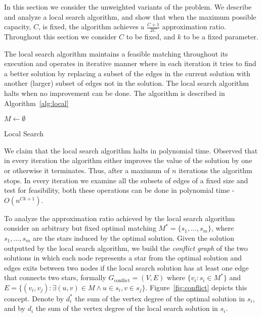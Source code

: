 In this section we consider the unweighted variants of the problem.
We describe and analyze a local search algorithm, 
and show that when the maximum possible capacity, $C$, is fixed, the algorithm achieves 
a $\frac{C + 1}{2C}$ approximation ratio.
Throughout this section we consider $C$ to be fixed, and $k$ to be a fixed parameter.  

The local search algorithm maintains a feasible matching throughout its execution
and operates in 
iterative manner where in each iteration it tries to find a better solution by
replacing a subset of the edges in the current solution with 
another (larger) subset of edges not in the solution.
The local search algorithm halts when no improvement can be done.
The algorithm is described in Algorithm~\ref{alg:local} 

\begin{algorithm}
$M \leftarrow \emptyset$								\\

\caption{
\label{alg:local}
Local Search}
\end{algorithm}


We claim that the local search algorithm halts in polynomial time.
Observed that in every iteration the algorithm either improves the value of the solution
by one or otherwise it terminates. 
Thus, after a maximum of $n$ iterations the algorithm stops.
In every iteration we examine all the subsets of edges of a fixed size and test for feasibility,
both these operations can be done in polynomial time - $O(n^{Ck + 1})$. 

To analyze the approximation ratio achieved by the local search algorithm consider an 
arbitrary but fixed optimal matching $M^* = \{s_1, \ldots, s_m\}$,
where $s_1, \ldots, s_m$ are the stars induced by the optimal solution.
Given the solution outputted by the local search algorithm,
we build the \emph{conflict graph} of the two solutions in which each node
represents a star from the optimal solution and edges exits between two nodes if
the local search solution has at least one edge that connects two stars, formally 
$G_\text{conflict} = (V, E)$ 
where $\{v_i : s_i \in M^* \}$ 
and $E = \{(v_i, v_j) : \exists (u,v) \in M \land u \in s_i, v \in s_j \}$.
Figure~\ref{fig:conflict} depicts this concept.
Denote by $d^*_i$ the sum of the vertex degree of the optimal solution in $s_i$, 
and by $d_i$ the sum of the vertex degree of the local search solution in $s_i$.

